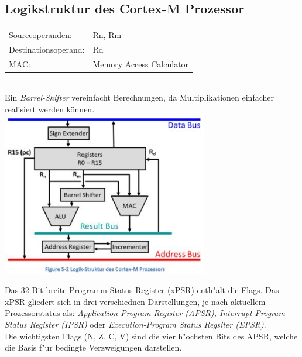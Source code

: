 %
\begin{minipage}[t]{9cm}
	\subsection{Logikstruktur des Cortex-M Prozessor}
        \begin{tabular}{ll} 
            Sourceoperanden:& Rn, Rm \\ 
            Destinationsoperand:& Rd  \\ 
            MAC:& Memory Access Calculator\\

        \end{tabular} \\
        Ein \textit{Barrel-Shifter} vereinfacht Berechnungen,\newline
        da Multiplikationen einfacher realisiert werden können.\\
        \includegraphics[width=9cm]{images/logikstrukturcortex}
        
        Das 32-Bit breite Programm-Status-Register (xPSR) enth"alt die Flags. Das xPSR gliedert sich in drei verschiednen Darstellungen, je nach aktuellem Prozessorstatus als: \textit{Application-Program Register (APSR), Interrupt-Program Status Register (IPSR)} oder \textit{Execution-Program Status Regsiter (EPSR)}.\\
        Die wichtigsten Flags (N, Z, C, V) sind die vier h"ochsten Bits des APSR, welche die Basis f"ur bedingte Verzweigungen darstellen.
\end{minipage}

